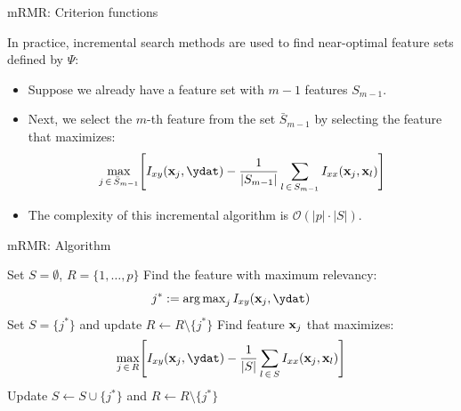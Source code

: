\begin{vbframe}{\MakeLowercase{M}RMR: Criterion functions}
\begin{itemize}
\end{itemize}
In practice, incremental search methods are used to find near-optimal feature sets defined by $\Psi$:
\begin{itemize}
\item Suppose we already have a feature set with $m-1$ features $S_{m-1}$.
\item Next, we select the $m$-th feature from the set $\bar{S}_{m-1}$ by selecting the feature that maximizes:
$$\max_{j \, \in \, \bar{S}_{m-1}} \Biggl[ I_{xy} (\xj, \ydat) - \frac{1}{|S_{m-1}|} \sum_{l \, \in \, S_{m-1}} I_{xx}(\xj, \xl)  \Biggr]$$
\item The complexity of this incremental algorithm is $\mathcal{O}(|p| \cdot| S|)$.
\end{itemize}
\end{vbframe}

\begin{vbframe}{\MakeLowercase{m}RMR: Algorithm}

\begin{algorithm}[H]
\footnotesize
  \begin{algorithmic}[1]
    \State Set $S = \emptyset$, $R = \{ 1, \dots, p \}$
    \State Find the feature with maximum relevancy:
    $$j^* := \argmax_{j} I_{xy} (\xj, \ydat)$$
    \State Set $S = \{ j^* \}$ and update $R \leftarrow R \setminus \{j^* \}$
    \Repeat
      \State Find feature $\mathbf{x}_j$ that maximizes:
      $$\max_{j \, \in \, R} \Biggl[ I_{xy} (\xj, \ydat) - \frac{1}{|S|} \sum_{l \, \in \, S} I_{xx}(\xj, \xl)  \Biggr]$$
      \State Update $S \leftarrow S \cup \{j^* \}$ and $R \leftarrow R \setminus \{ j^* \}$
    \caption{mRMR algorithm}
  \end{algorithmic}
\end{algorithm}
\end{vbframe}



